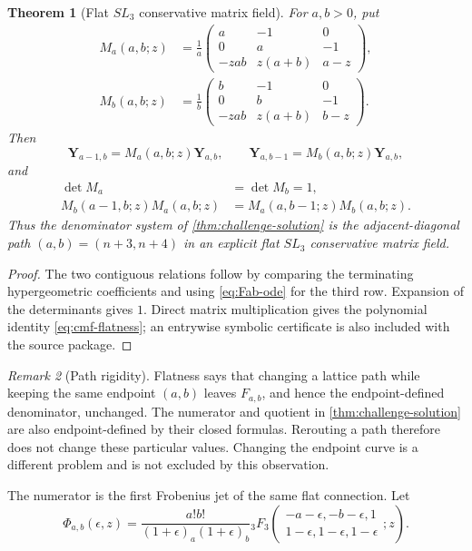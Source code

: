 \documentclass[11pt]{article}
\theoremstyle{keio}
\newtheorem{theorem}{Theorem}[section]
\theoremstyle{definition}
\theoremstyle{remark}
\newtheorem{remark}[theorem]{Remark}
\begin{document}
\begin{theorem}[Flat \(SL_3\) conservative matrix field]
\label{thm:flat-cmf}
For \(a,b>0\), put
\begin{align}
 M_a(a,b;z)&=\frac1a
 \begin{pmatrix}
 a&-1&0\\
 0&a&-1\\
 -zab&z(a+b)&a-z
 \end{pmatrix},\label{eq:Ma}\\
 M_b(a,b;z)&=\frac1b
 \begin{pmatrix}
 b&-1&0\\
 0&b&-1\\
 -zab&z(a+b)&b-z
 \end{pmatrix}.\label{eq:Mb}
\end{align}
Then
\[
 \mathbf Y_{a-1,b}=M_a(a,b;z)\mathbf Y_{a,b},
 \qquad
 \mathbf Y_{a,b-1}=M_b(a,b;z)\mathbf Y_{a,b},
\]
and
\begin{align}
 \det M_a&=\det M_b=1,\label{eq:cmf-det}\\
 M_b(a-1,b;z)M_a(a,b;z)
 &=M_a(a,b-1;z)M_b(a,b;z).
 \label{eq:cmf-flatness}
\end{align}
Thus the denominator system of \cref{thm:challenge-solution} is the
adjacent-diagonal path \((a,b)=(n+3,n+4)\) in an explicit flat \(SL_3\)
conservative matrix field.
\end{theorem}

\begin{proof}
The two contiguous relations follow by comparing the terminating
hypergeometric coefficients and using \eqref{eq:Fab-ode} for the third row.
Expansion of the determinants gives \(1\).  Direct matrix multiplication
gives the polynomial identity \eqref{eq:cmf-flatness}; an entrywise symbolic
certificate is also included with the source package.
\end{proof}

\begin{remark}[Path rigidity]
Flatness says that changing a lattice path while keeping the same endpoint
\((a,b)\) leaves \(F_{a,b}\), and hence the endpoint-defined denominator,
unchanged.  The numerator and quotient in \cref{thm:challenge-solution} are
also endpoint-defined by their closed formulas.  Rerouting a path therefore
does not change these particular values.  Changing the endpoint curve is a
different problem and is not excluded by this observation.
\end{remark}

The numerator is the first Frobenius jet of the same flat connection.  Let
\begin{equation}\label{eq:Phi-epsilon}
 \Phi_{a,b}(\epsilon,z)=
 \frac{a!b!}{(1+\epsilon)_a(1+\epsilon)_b}
 {}_3F_3\!\left(
 \begin{matrix}-a-\epsilon,-b-\epsilon,1\\
 1-\epsilon,1-\epsilon,1-\epsilon
 \end{matrix};z\right).
\end{equation}
\end{document}
